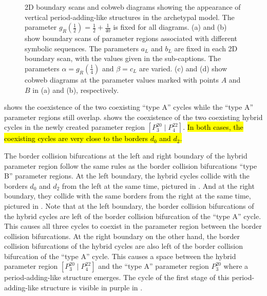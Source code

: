 \begin{figure}
{		\label{fig:add.change.appa.vert.cobweb.B}
	}
	\caption[2D boundary scans and cobweb diagrams showing the appearance of vertical period-adding-like structures in the archetypal model]{
		2D boundary scans and cobweb diagrams showing the appearance of vertical period-adding-like structures in the archetypal model.
		The parameter $g_R\left(\frac{1}{2}\right) = \frac{1}{2} + \frac{1}{40}$ is fixed for all diagrams.
		(a) and (b) show boundary scans of parameter regions associated with different symbolic sequences.
		The parameters $a_L$ and $b_L$ are fixed in each 2D boundary scan, with the values given in the sub-captions.
		The parameters $\alpha = g_R\left(\frac{1}{4}\right)$ and $\beta = c_L$ are varied.
		(c) and (d) show cobweb diagrams at the parameter values marked with points $A$ and $B$ in (a) and (b), respectively.
	}
\end{figure}

 shows the coexistence of the two coexisting ``type A'' cycles while the ``type A'' parameter regions still overlap.
 shows the coexistence of the two coexisting hybrid cycles in the newly created parameter region $\left[P^{20}_3 \mid P^{22}_4\right]$.
\hl{
	In both cases, the coexisting cycles are very close to the borders $d_0$ and $d_2$.
}

The border collision bifurcations at the left and right boundary of the hybrid parameter region follow the same rules as the border collision bifurcations ``type B'' parameter regions.
At the left boundary, the hybrid cycles collide with the borders $d_0$ and $d_2$ from the left at the same time, pictured in .
And at the right boundary, they collide with the same borders from the right at the same time, pictured in .
Note that at the left boundary, the border collision bifurcations of the hybrid cycles are left of the border collision bifurcation of the ``type A'' cycle.
This causes all three cycles to coexist in the parameter region between the border collision bifurcations.
At the right boundary on the other hand, the border collision bifurcations of the hybrid cycles are also left of the border collision bifurcation of the ``type A'' cycle.
This causes a space between the hybrid parameter region $\left[P^{20}_3 \mid P^{22}_4\right]$ and the ``type A'' parameter region $P^{20}_3$ where a period-adding-like structure emerges.
The cycle of the first stage of this period-adding-like structure is visible in purple in .


